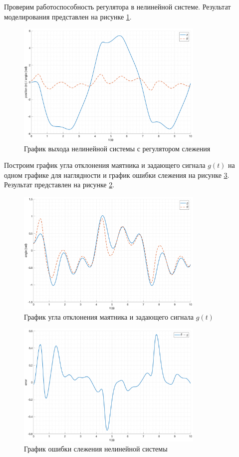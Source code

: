 \FloatBarrier
Проверим работоспособность регулятора в нелинейной системе. Результат моделирования представлен на рисунке \ref{fig:tracking_nlin}.
\begin{figure}[ht!]
    \centering
    \includegraphics[width=0.8\textwidth]{media/plots/follow/out_1.png}
    \caption{График выхода нелинейной системы с регулятором слежения}
    \label{fig:tracking_nlin}
\end{figure}
Построим график угла отклонения маятника и задающего сигнала $g(t)$ на одном графике для наглядности и 
график ошибки слежения на рисунке \ref{fig:tracking_nlin_err}.
Результат представлен на рисунке \ref{fig:tracking_nlin_cmp}.
\begin{figure}[ht!]
    \centering
    \includegraphics[width=0.8\textwidth]{media/plots/follow/cmp_1.png}
    \caption{График угла отклонения маятника и задающего сигнала $g(t)$}
    \label{fig:tracking_nlin_cmp}
\end{figure}
\begin{figure}[ht!]
    \centering
    \includegraphics[width=0.8\textwidth]{media/plots/follow/error_1.png}
    \caption{График ошибки слежения нелинейной системы}
    \label{fig:tracking_nlin_err}
\end{figure}
